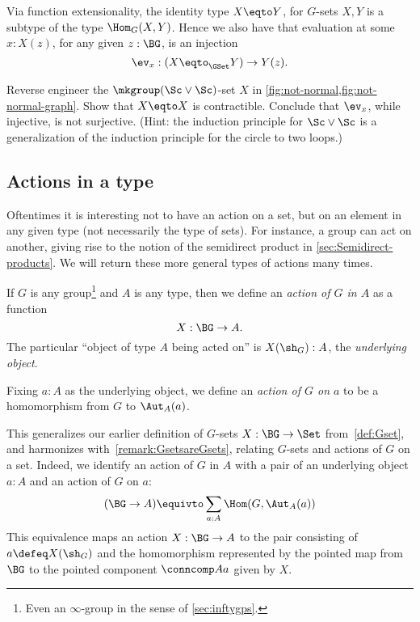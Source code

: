 Via function extensionality,
the identity type $X \eqto Y$, for $G$-sets $X,Y$
is a subtype of the type $\Hom_G(X,Y)$.
Hence we also have that evaluation at some $x:X(z)$,
for any given $z:\BG$, is an injection
\[
  \ev_x:(X \eqto_{\GSet} Y)\to Y(z).
\]
\begin{xca}\label{xca:not-normal}
Reverse engineer the $\mkgroup(\Sc\vee\Sc)$-set $X$ in 
\cref{fig:not-normal,fig:not-normal-graph}.
Show that $X\eqto X$ is contractible.
Conclude that $\ev_x$, while injective, is not surjective.
(Hint: the induction principle for $\Sc\vee\Sc$ is a generalization
of the induction principle for the circle to two loops.)
\end{xca}

\subsection{Actions in a type}
\label{sec:actions}
Oftentimes it is interesting not to have an action on a set, 
but on an element in any given type (not necessarily the type of sets).  
For instance, a group can act on another, giving rise to the notion of 
the semidirect product in \cref{sec:Semidirect-products}.  
We will return these more general types of actions many times.

\begin{definition}\label{action}
  If $G$ is any group\footnote{%
  Even an $\infty$-group in the sense of \cref{sec:inftygps}.}
  and $A$ is any type,
  then we define an \emph{action of $G$ in $A$} as a function
  \[
    X : \BG \to A.
  \]
  The particular ``object of type $A$ being acted on'' is $X(\sh_G):A$,
  the \emph{underlying object}.%

  Fixing $a:A$ as the underlying object, 
  we define an \emph{action of $G$ on $a$}
  to be a homomorphism from $G$ to $\Aut_A(a)$.%
\end{definition}
This generalizes our earlier definition of $G$-sets $X : \BG \to \Set$
from~\cref{def:Gset},
and harmonizes with~\cref{remark:GsetsareGsets}, relating $G$-sets and
actions of $G$ on a set.
Indeed, we identify
an action of $G$ in $A$ with a pair of an underlying object
$a:A$ and an action of $G$ on $a$:
\[
  (\BG \to A) \equivto \sum_{a:A}\Hom(G,\Aut_A(a))
\]
This equivalence maps an action $X:\BG\to A$
to the pair consisting of $a \defeq X(\sh_G)$
and the homomorphism represented by the pointed map
from $\BG$ to the pointed component $\conncomp A a$ given by $X$.

